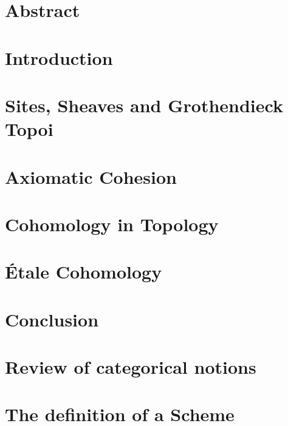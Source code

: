 \documentclass[11pt]{memoir}
\begin{document}
  \chapter*{Abstract}
  
  
  \tableofcontents

  \chapter{Introduction}
  

  \chapter{Sites, Sheaves and Grothendieck Topoi}
  

  \chapter{Axiomatic Cohesion}
  

  \chapter{Cohomology in Topology}
  

  \chapter{\'Etale Cohomology}
  

  \chapter{Conclusion}
  

  \appendix
  \chapter{Review of categorical notions}
  
  \chapter{The definition of a Scheme}
  

  
  
\end{document}
